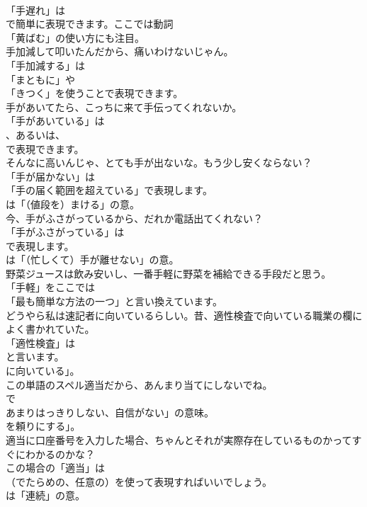 \documentclass[8pt]{extreport}
\begin{document}
\begin{CJK}{UTF8}{min}
\\	「手遅れ」は
\\	で簡単に表現できます。ここでは動詞
\\	「黄ばむ」の使い方にも注目。	
\\	手加減して叩いたんだから、痛いわけないじゃん。 
\\	「手加減する」は
\\	「まともに」や
\\	「きつく」を使うことで表現できます。	
\\	手があいてたら、こっちに来て手伝ってくれないか。 
\\	「手があいている」は 
\\	、あるいは、
\\	で表現できます。	
\\	そんなに高いんじゃ、とても手が出ないな。もう少し安くならない？ 
\\	「手が届かない」は
\\	「手の届く範囲を超えている」で表現します。
\\	は「（値段を）まける」の意。	
\\	今、手がふさがっているから、だれか電話出てくれない？ 
\\	「手がふさがっている」は 
\\	で表現します。
\\	は「（忙しくて）手が離せない」の意。	
\\	野菜ジュースは飲み安いし、一番手軽に野菜を補給できる手段だと思う。 
\\	「手軽」をここでは
\\	「最も簡単な方法の一つ」と言い換えています。	
\\	どうやら私は速記者に向いているらしい。昔、適性検査で向いている職業の欄によく書かれていた。 
\\	「適性検査」は
\\	と言います。
\\	に向いている」。	
\\	この単語のスペル適当だから、あんまり当てにしないでね。 
\\	で
\\	あまりはっきりしない、自信がない」の意味。
\\	を頼りにする」。	
\\	適当に口座番号を入力した場合、ちゃんとそれが実際存在しているものかってすぐにわかるのかな？ 
\\	この場合の「適当」は 
\\	（でたらめの、任意の）を使って表現すればいいでしょう。
\\	は「連続」の意。	

\end{CJK}
\end{document}
